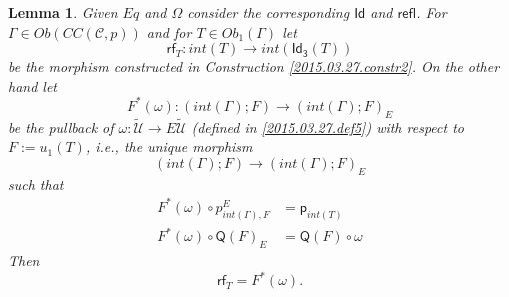 \documentclass[12pt]{article}
\numberwithin{equation}{section}
\newtheorem{lemma}[proposition]{Lemma}
\newcommand{\sr}{\rightarrow}
\newcommand{\wt}{\widetilde}
\newcommand{\toCC}{CC} %
\newcommand{\C}{{\mathcal C}}  %
\newcommand{\p}{\mathsf{p}}
\newcommand{\Id}{\mathsf{Id}} %
\newcommand{\Idx}{\mathsf{Id_3}} %
\newcommand{\refl}{\mathsf{refl}}
\newcommand{\U}{\mathcal{U}}
\newcommand{\rf}{\mathsf{rf}}
\newcommand{\Q}{\mathsf{Q}}
\begin{document}
\begin{lemma}
\label{2015.03.31.l2} Given $Eq$ and $\Omega$ consider the corresponding $\Id$
and $\refl$. For $\Gamma \in Ob(\toCC({\C},p))$ and for $T\in Ob_1(\Gamma)$ let
$$\rf_T:int(T)\sr int(\Idx(T))$$
%
be the morphism constructed in Construction \ref{2015.03.27.constr2}. On the
other hand let
%
$$F^*(\omega):(int(\Gamma);F)\sr (int(\Gamma);F)_{E}$$
%
be the pullback of $\omega : \wt{\U}\sr E\wt{\U}$ (defined in \ref{2015.03.27.def5}) with respect to $F:=u_1(T)$,
i.e., the unique morphism
%
$$(int(\Gamma);F)\sr (int(\Gamma);F)_{E}$$
%
such that
%
\begin{align}
  F^*(\omega)\circ p^{E}_{int(\Gamma),F} & = \p_{int(T)}          \label{eqn1} \\
  F^*(\omega)\circ \Q(F)_{E}             & = \Q(F) \circ \omega   \label{eqn2}
\end{align}
%
Then
%
\[\rf_T=F^*(\omega).\]
%
\end{lemma}
%
\end{document}
